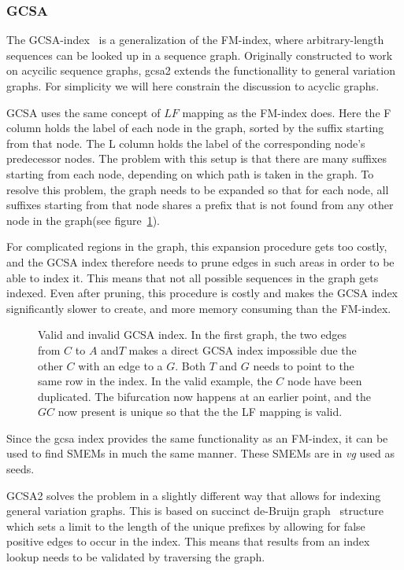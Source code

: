 \subsubsection{GCSA}
The GCSA-index~\cite{gcsa1, gcsa2} is a generalization of the FM-index, where arbitrary-length sequences can be looked up in a sequence graph.
Originally constructed to work on acycilic sequence graphs, gcsa2 extends the functionallity to general variation graphs.
For simplicity we will here constrain the discussion to acyclic graphs.

GCSA uses the same concept of $LF$ mapping as the FM-index does. Here the F column holds the label of each node in the graph, sorted by the suffix starting from that node. The L column holds the label of the corresponding node's predecessor nodes. The problem with this setup is that there are many suffixes starting from each node, depending on which path is taken in the graph. To resolve this problem, the graph needs to be expanded so that for each node, all suffixes starting from that node shares a prefix that is not found from any other node in the graph(see figure~\ref{fig:gcsa}).

For complicated regions in the graph, this expansion procedure gets too costly, and the GCSA index therefore needs to prune edges in such areas in order to be able to index it. This means that not all possible sequences in the graph gets indexed. Even after pruning, this procedure is costly and makes the GCSA index significantly slower to create, and more memory consuming than the FM-index.

\begin{figure}
  \tikzpicture
  
  \endtikzpicture
  \label{fig:gcsa}
  \caption{
    Valid and invalid GCSA index.
    In the first graph, the two edges from $C$ to $A$ and$T$ makes a direct GCSA index impossible due the other $C$ with an edge to a $G$.
    Both $T$ and $G$ needs to point to the same row in the index.
    In the valid example, the $C$ node have been duplicated.
    The bifurcation now happens at an earlier point, and the $GC$ now present is unique so that the the LF mapping is valid.}
\end{figure}

Since the gcsa index provides the same functionality as an FM-index, it can be used to find SMEMs in much the same manner. These SMEMs are in \emph{vg} used as seeds. 

GCSA2 solves the problem in a slightly different way that allows for indexing general variation graphs.
This is based on succinct de-Bruijn graph~\cite{debruijn, succinctdebruijn} structure which sets a limit to the length of the unique prefixes by allowing for false positive edges to occur in the index.
This means that results from an index lookup needs to be validated by traversing the graph. 

